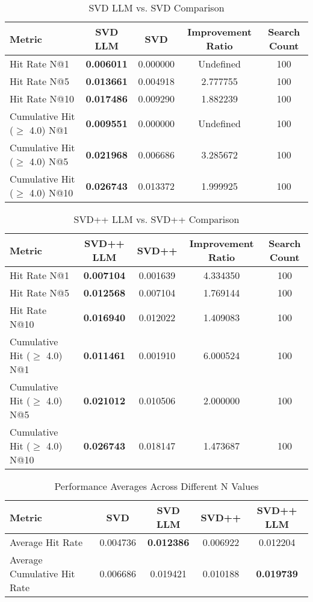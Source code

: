 \documentclass[sigconf]{acmart}
\begin{document}
\begin{table*}
\centering
\caption{SVD LLM vs. SVD Comparison}
\label{tab:svd_comparison}
\begin{tabular}{lcccc}
\toprule
\textbf{Metric} & \textbf{SVD LLM} & \textbf{SVD} & \textbf{Improvement Ratio} & \textbf{Search Count} \\
\midrule
Hit Rate N@1 & \textbf{0.006011} & 0.000000 & Undefined & 100 \\
Hit Rate N@5 & \textbf{0.013661} & 0.004918 & 2.777755 & 100 \\
Hit Rate N@10 & \textbf{0.017486} & 0.009290 & 1.882239 & 100 \\
Cumulative Hit ($\geq$ 4.0) N@1 & \textbf{0.009551} & 0.000000 & Undefined & 100 \\
Cumulative Hit ($\geq$ 4.0) N@5 & \textbf{0.021968} & 0.006686 & 3.285672 & 100 \\
Cumulative Hit ($\geq$ 4.0) N@10 & \textbf{0.026743} & 0.013372 & 1.999925 & 100 \\
\bottomrule
\end{tabular}
\end{table*}

\begin{table*}
\centering
\caption{SVD++ LLM vs. SVD++ Comparison}
\label{tab:svdpp_comparison}
\begin{tabular}{lcccc}
\toprule
\textbf{Metric} & \textbf{SVD++ LLM} & \textbf{SVD++} & \textbf{Improvement Ratio} & \textbf{Search Count} \\
\midrule
Hit Rate N@1 & \textbf{0.007104} & 0.001639 & 4.334350 & 100 \\
Hit Rate N@5 & \textbf{0.012568} & 0.007104 & 1.769144 & 100 \\
Hit Rate N@10 & \textbf{0.016940} & 0.012022 & 1.409083 & 100 \\
Cumulative Hit ($\geq$ 4.0) N@1 & \textbf{0.011461} & 0.001910 & 6.000524 & 100 \\
Cumulative Hit ($\geq$ 4.0) N@5 & \textbf{0.021012} & 0.010506 & 2.000000 & 100 \\
Cumulative Hit ($\geq$ 4.0) N@10 & \textbf{0.026743} & 0.018147 & 1.473687 & 100 \\
\bottomrule
\end{tabular}
\end{table*}

\begin{table*}[t]
\centering
\caption{Performance Averages Across Different N Values}
\label{tab:averages}
\begin{tabular}{lcccc}
\toprule
\textbf{Metric} & \textbf{SVD} & \textbf{SVD LLM} & \textbf{SVD++} & \textbf{SVD++ LLM} \\
\midrule
Average Hit Rate & 0.004736 & \textbf{0.012386} & 0.006922 & 0.012204 \\
Average Cumulative Hit Rate & 0.006686 & 0.019421 & 0.010188 & \textbf{0.019739} \\
\bottomrule
\end{tabular}
\end{table*}
\end{document}
